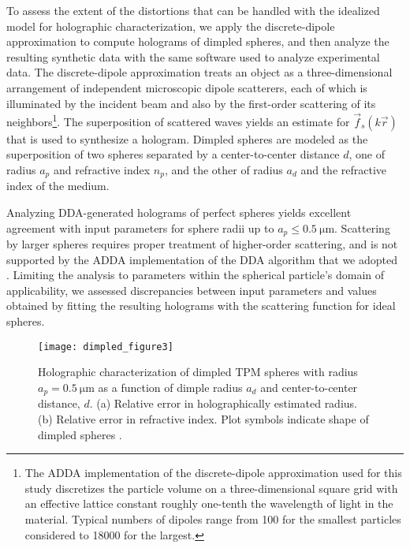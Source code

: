 To assess the extent of the distortions that can be handled with the
idealized model for holographic characterization, we apply the
discrete-dipole approximation \cite{draine94,yurkin11,fung12,perry12,wang14using}
to compute holograms of 
dimpled spheres, and then analyze the resulting synthetic data
with the same software used to analyze experimental data.
The discrete-dipole approximation treats an object as a three-dimensional
arrangement of independent microscopic dipole scatterers, each of which
is illuminated by the incident beam and also by the first-order scattering
of its neighbors\footnote{The ADDA implementation of the discrete-dipole approximation
\cite{yurkin11} used for this study discretizes the particle volume on a 
three-dimensional square grid with an effective lattice constant
roughly one-tenth the wavelength of light in the material.  Typical
numbers of dipoles range from \num{100} for the smallest particles
considered to \num{18000} for the largest.}.
The superposition of scattered waves yields an estimate for 
$\vec{f}_s(k\vec{r})$ that is used to synthesize a hologram.
Dimpled spheres are modeled as the superposition of
two spheres separated by a center-to-center distance $d$, one
of radius $a_p$ and refractive index $n_p$, and the other of radius
$a_d$ and the refractive index of the medium.

Analyzing DDA-generated holograms of perfect spheres yields 
excellent agreement
with input parameters for sphere radii up to $a_p \le \SI{0.5}{\um}$. 
Scattering by larger spheres requires proper treatment of higher-order scattering,
and is not supported by the ADDA implementation of the DDA algorithm
that we adopted \cite{yurkin11,wang14using}.
Limiting the analysis to parameters within the spherical particle's domain of
applicability, we assessed discrepancies between input parameters
and values obtained by fitting
the resulting holograms with the scattering function for ideal spheres.

\begin{figure}[!t]
  \centering
  \texttt{[image: dimpled\_figure3]}
  \caption{Holographic characterization of dimpled TPM spheres 
    with radius $a_p = \SI{0.5}{\um}$ as a function of dimple radius
    $a_d$ and center-to-center distance, $d$.
    (a) Relative error in holographically estimated radius.
    (b) Relative error in refractive index.
    Plot symbols indicate shape of dimpled spheres \cite{hannel15}.}
  \label{fig:dimpledperformance}
\end{figure}

